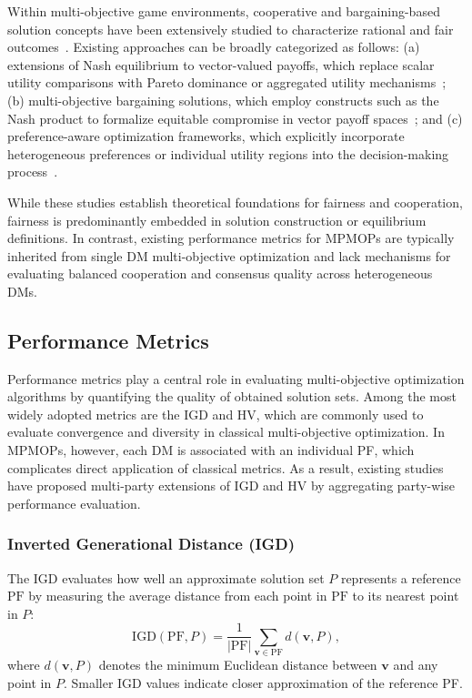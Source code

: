 \documentclass[journal]{IEEEtran}
\begin{document}
Within multi-objective game environments, cooperative and bargaining-based solution concepts have been extensively studied to characterize rational and fair outcomes~\cite{moulin1984implementing,cha2022ecs}. Existing approaches can be broadly categorized as follows:  
(a) extensions of Nash equilibrium to vector-valued payoffs, which replace scalar utility comparisons with Pareto dominance or aggregated utility mechanisms~\cite{ropke2022nash,li2024open,ruadulescu2020utility,ruadulescu2022opponent};  
(b) multi-objective bargaining solutions, which employ constructs such as the Nash product to formalize equitable compromise in vector payoff spaces~\cite{ruan2023multiobjective,li2022coordination,wang2023nash,meng2024nash}; and  
(c) preference-aware optimization frameworks, which explicitly incorporate heterogeneous preferences or individual utility regions into the decision-making process~\cite{ip2025user,huang2024direct,li2023interactive}.

While these studies establish theoretical foundations for fairness and cooperation, fairness is predominantly embedded in solution construction or equilibrium definitions. In contrast, existing performance metrics for MPMOPs are typically inherited from single DM multi-objective optimization and lack mechanisms for evaluating balanced cooperation and consensus quality across heterogeneous DMs.

\subsection{Performance Metrics}
\label{subsec:performance_metrics}

Performance metrics play a central role in evaluating multi-objective optimization algorithms by quantifying the quality of obtained solution sets. Among the most widely adopted metrics are the IGD and HV, which are commonly used to evaluate convergence and diversity in classical multi-objective optimization. In MPMOPs, however, each DM is associated with an individual PF, which complicates direct application of classical metrics. As a result, existing studies have proposed multi-party extensions of IGD and HV by aggregating party-wise performance evaluation.

\subsubsection{Inverted Generational Distance (IGD)}

The IGD evaluates how well an approximate solution set $P$ represents a reference $\mathrm{PF}$ by measuring the average distance from each point in $\mathrm{PF}$ to its nearest point in $P$:
\begin{equation}
	\label{def:IGD}
	\mathrm{IGD}(\mathrm{PF},P) = \frac{1}{|\mathrm{PF}|}\sum_{\mathbf{v} \in \mathrm{PF}} d(\mathbf{v},P),
\end{equation}
where $d(\mathbf{v},P)$ denotes the minimum Euclidean distance between $\mathbf{v}$ and any point in $P$. Smaller IGD values indicate closer approximation of the reference PF.
\end{document}
